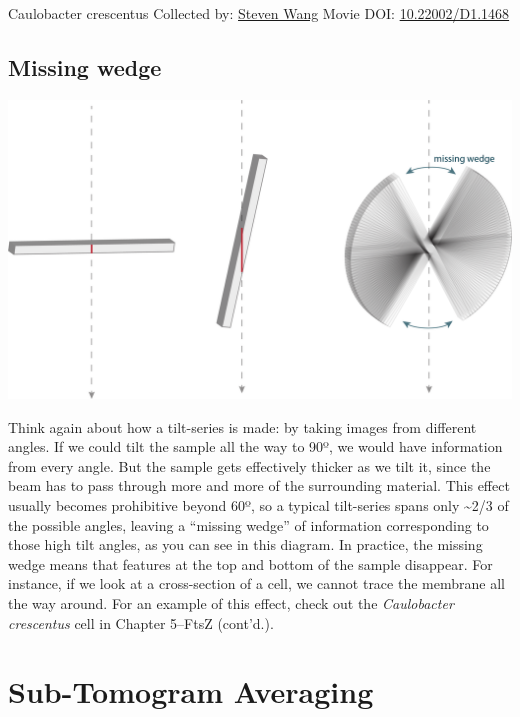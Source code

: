 \documentclass[]{tufte-book}
\begin{document}
\hypertarget{htmlwidget-45cab985813a4c8549f6}{}

\label{fig:1-6}Caulobacter crescentus Collected by: \protect\hyperlink{steven_wang}{Steven Wang} Movie DOI: \href{https://doi.org/10.22002/D1.1468}{10.22002/D1.1468}

\hypertarget{Missing_wedge}{%
\subsection{Missing wedge}\label{Missing_wedge}}

\includegraphics{img/schematics/1_6_1}

Think again about how a tilt-series is made: by taking images from different angles. If we could tilt the sample all the way to 90º, we would have information from every angle. But the sample gets effectively thicker as we tilt it, since the beam has to pass through more and more of the surrounding material. This effect usually becomes prohibitive beyond 60º, so a typical tilt-series spans only \textasciitilde{}2/3 of the possible angles, leaving a ``missing wedge'' of information corresponding to those high tilt angles, as you can see in this diagram. In practice, the missing wedge means that features at the top and bottom of the sample disappear. For instance, if we look at a cross-section of a cell, we cannot trace the membrane all the way around. For an example of this effect, check out the \emph{Caulobacter crescentus} cell in Chapter 5--FtsZ (cont'd.).

\hypertarget{sub-tomogram-averaging}{%
\section{Sub-Tomogram Averaging}\label{sub-tomogram-averaging}}
\end{document}

